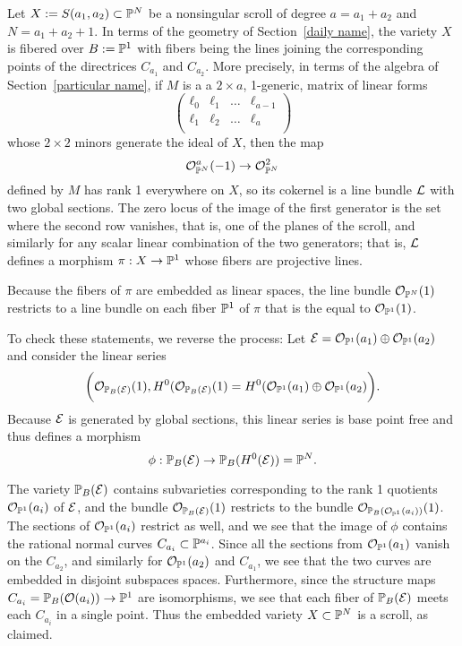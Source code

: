 Let $X := S(a_{1}, a_{2})\subset \PP^{N}$ be a nonsingular scroll of degree $a=a_{1}+a_{2}$ and $N = a_{1}+a_{2}+1$. In terms of the geometry of Section~\ref{daily name}, the variety $X$ is fibered over
$B:=\PP^{1}$ with fibers being the lines joining the corresponding points of the directrices $C_{a_{1}}$ and 
$C_{a_{2}}$. More precisely, in terms of the algebra of Section~\ref{particular name}, if $M$ is a
a $2\times a$, 1-generic, matrix of linear forms
$$
\begin{pmatrix}
 \ell_0&\ell_{1}&\dots &\ell_{a-1}\\
 \ell_1&\ell_{2}&\dots &\ell_{a}\\ 
\end{pmatrix}
$$
 whose $2\times 2$ minors generate the ideal of $X$,
then the map 
$$
\sO_{\PP^{N}}^{a}(-1)\to \sO_{\PP^{N}}^{2}
$$
 defined by $M$ has rank 1 everywhere
on $X$, so its cokernel is a line bundle $\sL$ with two global sections. The zero locus
of the image of the first generator is the set where the second row vanishes, that is, 
one of the planes of the scroll, and similarly for any scalar linear combination of the
two generators; that is, $\sL$ defines a morphism $\pi: X \to \PP^{1}$ whose fibers are
projective lines.

Because the fibers of $\pi$ are embedded as linear spaces, the line bundle $\sO_{\PP^{N}}(1)$
restricts to a line bundle on each fiber $\PP^{1}$ of $\pi$ that is the  equal to $\sO_{\PP^{1}}(1)$.

To check these statements, we reverse the process: Let 
$\sE =  \sO_{\PP^{1}}(a_{1}) \oplus \sO_{\PP^{1}}(a_{2})$
and consider the linear series  
$$
\biggl(\sO_{\PP_B(\sE)}(1), H^{0}(\sO_{\PP_B(\sE)}(1) = H^{0}(\sO_{\PP^{1}}(a_{1}) \oplus \sO_{\PP^{1}}(a_{2})\biggr).
$$
Because $\sE$ is generated by global sections, this linear series is base point free and thus defines
a morphism
$$
\phi:  \PP_B(\sE) \to \PP_B(H^{0}(\sE)) = \PP^{N}.
$$

The variety $\PP_B(\sE)$ contains subvarieties corresponding to the rank 1 quotients 
$\sO_{\PP^{1}}(a_{i})$ of $\sE$, and the bundle $\sO_{\PP_B(\sE)}(1)$ restricts to
the bundle $\sO_{\PP_B(\sO_{\PP^{1}}(a_{i}))}(1)$. The sections of $\sO_{\PP^{1}}(a_{i})$ restrict
as well, and we see that the image of $\phi$ contains the rational normal curves
$C_{a_{i}}\subset \PP^{a_{i}}$. Since all the sections from $\sO_{\PP^{1}}(a_{1})$ vanish on the $C_{a_{2}}$, and similarly for $\sO_{\PP^{1}}(a_{2})$ and $C_{a_{1}}$, we see that the two curves are embedded in  disjoint subspaces spaces. Furthermore, since the structure maps $C_{a_{i}} = \PP_{B}(\sO(a_{i})) \to \PP^{1}$ are
isomorphisms, we see that each
 fiber of $\PP_B(\sE)$ meets each $C_{a_{i}}$ in a single point. Thus the embedded
 variety $X\subset \PP^{N}$ is a scroll, as claimed.


